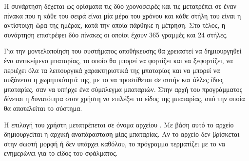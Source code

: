 \documentclass[12pt]{report}
\begin{document}
{{}

{}

Η συνάρτηση {} δέχεται ως ορίσματα τις δύο χρονοσειρές και τις μετατρέπει σε έναν πίνακα που η κάθε του σειρά
είναι μία μέρα του χρόνου και κάθε στήλη του είναι η αντίστοιχη ώρα της ημέρας, κατά την οποία πάρθηκε η μέτρηση. 
Στο τέλος, η συνάρτηση επιστρέφει δύο πίνακες οι οποίοι έχουν 365 γραμμές και 24 στήλες.

Για την μοντελοποίηση του συστήματος αποθήκευσης θα χρειαστεί να δημιουργηθεί ένα αντικείμενο μπαταρίας, το οποίο θα 
μπορεί να φορτίζει και να ξεφορτίζει, να περιέχει όλα τα λειτουργικά χαρακτηριστικά της μπαταρίας και να μπορεί να αυξάνεται
η χωρητικότητά της, με το να προστίθεται σε αυτήν και άλλες ίδιες μπαταρίες, σαν να υπήρχε ένα σύμπλεγμα μπαταριών.
Στην αρχή του προγράμματος δίνεται η δυνατότητα στον χρήστη να επιλέξει το είδος της μπαταρίας, από την οποία θα αποτελείται το σύστημα.

{}

Η επιλογή του χρήστη μετατρέπεται σε όνομα αρχείου {}. Με βάση αυτό το αρχείο δημιουργείται η αρχική αναπάρασταση
μίας μπαταρίας. Αν το αρχείο δεν βρίσκεται στην σωστή μορφή ή δεν υπάρχει καθόλου, το πρόγραμμα τερματίζει με το να ενημερώνει για το
είδος του σφάλματος.

{}

}
\end{document}
